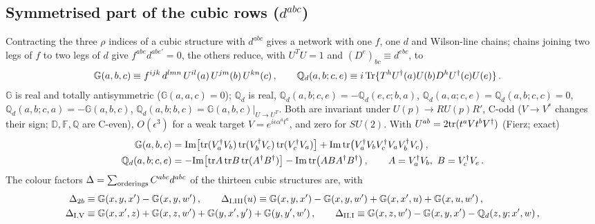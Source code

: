 \documentclass[9pt]{article}
\def\mf#1{\mathbb{#1}}
\numberwithin{equation}{section}
\begin{document}
{\subsection{Symmetrised part of the cubic rows ($d^{abc}$)}\label{sec:s-dabc}
 Contracting the three $\rho$ indices of a cubic structure with $d^{abc}$ gives a network with one $f$, one $d$ and Wilson-line chains; chains joining two legs of $f$ to two legs of $d$ give $f^{abe}d^{abe'}=0$, the others reduce, with $U^{T}U=1$ and $(D^{e})_{bc}\equiv d^{ebc}$, to
\begin{align}
\mf{G}(a,b,c)&\equiv f^{ijk}\,d^{lmn}\,U^{il}(a)\,U^{jm}(b)\,U^{kn}(c)\,,\qquad
\mf{Q}_{d}(a,b;c,e)\equiv i\,{\rm Tr}\{T^{h}U^{\dagger}(a)U(b)D^{h}U^{\dagger}(c)U(e)\}\,.\label{eq:s-GQ}
\end{align}
$\mf{G}$ is real and totally antisymmetric ($\mf{G}(a,a,c)=0$); $\mf{Q}_{d}$ is real, $\mf{Q}_{d}(a,b;c,e)=-\mf{Q}_{d}(e,c;b,a)$, $\mf{Q}_{d}(a,a;c,e)=\mf{Q}_{d}(a,b;c,c)=0$, $\mf{Q}_{d}(a,b;c,a)=-\mf{G}(a,b,c)$, $\mf{Q}_{d}(a,b;b,c)=\mf{G}(a,b,c)|_{U\to U^{T}}$. Both are invariant under $U(p)\to RU(p)R'$, C-odd ($V\to V^{*}$ changes their sign; $\mf{D},\mf{F},\mf{Q}$ are C-even), $O(\epsilon^{3})$ for a weak target $V=e^{i\epsilon\alpha^{a}t^{a}}$, and zero for $SU(2)$. With $U^{ab}=2{\rm tr}(t^{a}Vt^{b}V^{\dagger})$ (Fierz; exact)
\begin{align}
\mf{G}(a,b,c)&={\rm Im}\big[{\rm tr}(V_{a}^{\dagger}V_{b})\,{\rm tr}(V_{b}^{\dagger}V_{c})\,{\rm tr}(V_{c}^{\dagger}V_{a})\big]+{\rm Im}\,{\rm tr}\big(V_{a}^{\dagger}V_{b}V_{c}^{\dagger}V_{a}V_{b}^{\dagger}V_{c}\big)\,,\notag\\
\mf{Q}_{d}(a,b;c,e)&=-{\rm Im}\big[{\rm tr}A\,{\rm tr}B\,{\rm tr}(A^{\dagger}B^{\dagger})\big]-{\rm Im}\,{\rm tr}\big(ABA^{\dagger}B^{\dagger}\big)\,,\qquad A=V_{a}^{\dagger}V_{b},\ B=V_{c}^{\dagger}V_{e}\,.\label{eq:s-Gfund}
\end{align}
The colour factors $\Delta=\sum_{\rm orderings}C^{abc}d^{abc}$ of the thirteen cubic structures are, with
\begin{align}
\Delta_{2b}&\equiv\mf{G}(x,y,x')-\mf{G}(x,y,w')\,,\qquad
\Delta_{\rm I.III}(u)\equiv\mf{G}(x,y,x')-\mf{G}(x,y,w')+\mf{G}(x,x',u)+\mf{G}(x,u,w')\,,\notag\\
\Delta_{\rm I.V}&\equiv\mf{G}(x,x',z)+\mf{G}(x,z,w')+\mf{G}(y,x',y')+\mf{G}(y,y',w')\,,\qquad
\Delta_{\rm II.I}\equiv\mf{G}(x,z,w')-\mf{G}(x,y,x')-\mf{Q}_{d}(z,y;x',w)\,,\notag\\

\end{align}}
\end{document}
